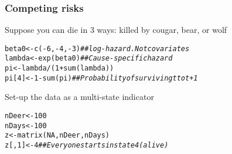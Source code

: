 \documentclass[color=usenames,dvipsnames]{beamer}\usepackage[]{graphicx}\usepackage[]{color}
\makeatletter
\newcommand{\hlnum}[1]{\textcolor[rgb]{0.69,0.494,0}{#1}}%
\newcommand{\hlcom}[1]{\textcolor[rgb]{0.514,0.506,0.514}{\textit{#1}}}%
\newcommand{\hlopt}[1]{\textcolor[rgb]{0,0,0}{#1}}%
\newcommand{\hlstd}[1]{\textcolor[rgb]{0,0,0}{#1}}%
\newcommand{\hlkwb}[1]{\textcolor[rgb]{0,0.341,0.682}{#1}}%
\newcommand{\hlkwd}[1]{\textcolor[rgb]{0.004,0.004,0.506}{#1}}%
\newenvironment{kframe}{%
 \def\at@end@of@kframe{}%
 \ifinner\ifhmode%
  \def\at@end@of@kframe{\end{minipage}}%
  \begin{minipage}{\columnwidth}%
 \fi\fi%
 \def\FrameCommand##1{\hskip\@totalleftmargin \hskip-\fboxsep
 \colorbox{shadecolor}{##1}\hskip-\fboxsep
     \hskip-\linewidth \hskip-\@totalleftmargin \hskip\columnwidth}%
 \MakeFramed {\advance\hsize-\width
   \@totalleftmargin\z@ \linewidth\hsize
   \@setminipage}}%
 {\par\unskip\endMakeFramed%
 \at@end@of@kframe}
\newenvironment{knitrout}{}{} %
\makeatother
\begin{document}
\begin{frame}[fragile]
  \frametitle{Competing risks}
  Suppose you can die in 3 ways: killed by cougar, bear, or wolf
\begin{knitrout}\small
{}\color{fgcolor}\begin{kframe}
\begin{alltt}
\hlstd{beta0} \hlkwb{<-} \hlkwd{c}\hlstd{(}\hlopt{-}\hlnum{6}\hlstd{,} \hlopt{-}\hlnum{4}\hlstd{,} \hlopt{-}\hlnum{3}\hlstd{)} \hlcom{## log-hazard. Not covariates}
\hlstd{lambda} \hlkwb{<-} \hlkwd{exp}\hlstd{(beta0)}   \hlcom{## Cause-specific hazard}
\hlstd{pi} \hlkwb{<-} \hlstd{lambda} \hlopt{/} \hlstd{(}\hlnum{1}\hlopt{+}\hlkwd{sum}\hlstd{(lambda))}
\hlstd{pi[}\hlnum{4}\hlstd{]} \hlkwb{<-} \hlnum{1}\hlopt{-}\hlkwd{sum}\hlstd{(pi)}     \hlcom{## Probability of surviving t to t+1}
\end{alltt}
\end{kframe}
\end{knitrout}
\pause
\vfill
  Set-up the data as a multi-state indicator
\begin{knitrout}\small
{}\color{fgcolor}\begin{kframe}
\begin{alltt}
\hlstd{nDeer} \hlkwb{<-} \hlnum{100}
\hlstd{nDays} \hlkwb{<-} \hlnum{100}
\hlstd{z} \hlkwb{<-} \hlkwd{matrix}\hlstd{(}\hlnum{NA}\hlstd{, nDeer, nDays)}
\hlstd{z[,}\hlnum{1}\hlstd{]} \hlkwb{<-} \hlnum{4}  \hlcom{## Everyone starts in state 4 (alive)}
\end{alltt}
\end{kframe}
\end{knitrout}
\end{frame}
\end{document}
